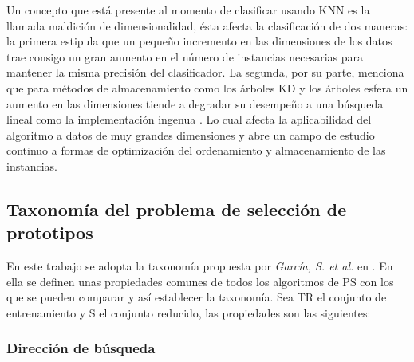 Un concepto que está presente al momento de clasificar usando KNN es la llamada maldición de dimensionalidad, ésta afecta la clasificación de dos maneras: la primera estipula que un pequeño incremento en las dimensiones de los datos trae consigo un gran aumento en el número de instancias necesarias para mantener la misma precisión del clasificador. La segunda, por su parte, menciona que para métodos de almacenamiento como los árboles KD y los árboles esfera un aumento en las dimensiones tiende a degradar su desempeño a una búsqueda lineal como la implementación ingenua \cite{keogh2017curse}. Lo cual afecta la aplicabilidad del algoritmo a datos de muy grandes dimensiones y abre un campo de estudio continuo a formas de optimización del ordenamiento y almacenamiento de las instancias.

\subsection{Taxonomía del problema de selección de prototipos}

En este trabajo se adopta la taxonomía propuesta por \emph{García, S. et al.} en \cite{garcia2012prototype}. En ella se definen unas propiedades comunes de todos los algoritmos de PS con los que se pueden comparar y así establecer la taxonomía. Sea TR el conjunto de entrenamiento y S el conjunto reducido, las propiedades son las siguientes:

\subsubsection{Dirección de búsqueda}

